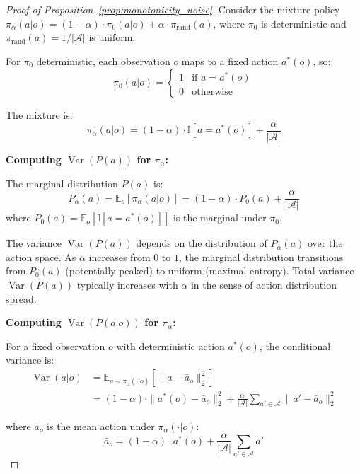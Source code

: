 \documentclass[twoside]{article}
\DeclareMathOperator{\Var}{Var}
\theoremstyle{remark}
\begin{document}
\begin{proof}[Proof of Proposition~\ref{prop:monotonicity_noise}]
Consider the mixture policy $\pi_\alpha(a|o) = (1-\alpha) \cdot \pi_0(a|o) + \alpha \cdot \pi_{\mathrm{rand}}(a)$, where $\pi_0$ is deterministic and $\pi_{\mathrm{rand}}(a) = 1/|\mathcal{A}|$ is uniform.

For $\pi_0$ deterministic, each observation $o$ maps to a fixed action $a^*(o)$, so:
\begin{equation}
\pi_0(a|o) = \begin{cases}
1 & \text{if } a = a^*(o) \\
0 & \text{otherwise}
\end{cases}
\end{equation}

The mixture is:
\begin{equation}
\pi_\alpha(a|o) = (1-\alpha) \cdot \mathbb{I}[a = a^*(o)] + \frac{\alpha}{|\mathcal{A}|}
\end{equation}

\textbf{Computing $\Var(P(a))$ for $\pi_\alpha$:}

The marginal distribution $P(a)$ is:
\begin{equation}
P_\alpha(a) = \mathbb{E}_o[\pi_\alpha(a|o)] = (1-\alpha) \cdot P_0(a) + \frac{\alpha}{|\mathcal{A}|}
\end{equation}
where $P_0(a) = \mathbb{E}_o[\mathbb{I}[a = a^*(o)]]$ is the marginal under $\pi_0$.

The variance $\Var(P(a))$ depends on the distribution of $P_\alpha(a)$ over the action space. As $\alpha$ increases from $0$ to $1$, the marginal distribution transitions from $P_0(a)$ (potentially peaked) to uniform (maximal entropy). Total variance $\Var(P(a))$ typically increases with $\alpha$ in the sense of action distribution spread.

\textbf{Computing $\Var(P(a|o))$ for $\pi_\alpha$:}

For a fixed observation $o$ with deterministic action $a^*(o)$, the conditional variance is:
\begin{align}
\Var(a|o) &= \mathbb{E}_{a \sim \pi_\alpha(\cdot|o)}[\|a - \bar{a}_o\|_2^2] \\
&= (1-\alpha) \cdot \|a^*(o) - \bar{a}_o\|_2^2 + \frac{\alpha}{|\mathcal{A}|} \sum_{a' \in \mathcal{A}} \|a' - \bar{a}_o\|_2^2
\end{align}

where $\bar{a}_o$ is the mean action under $\pi_\alpha(\cdot|o)$:
\begin{equation}
\bar{a}_o = (1-\alpha) \cdot a^*(o) + \frac{\alpha}{|\mathcal{A}|} \sum_{a' \in \mathcal{A}} a'
\end{equation}


\end{proof}
\end{document}

